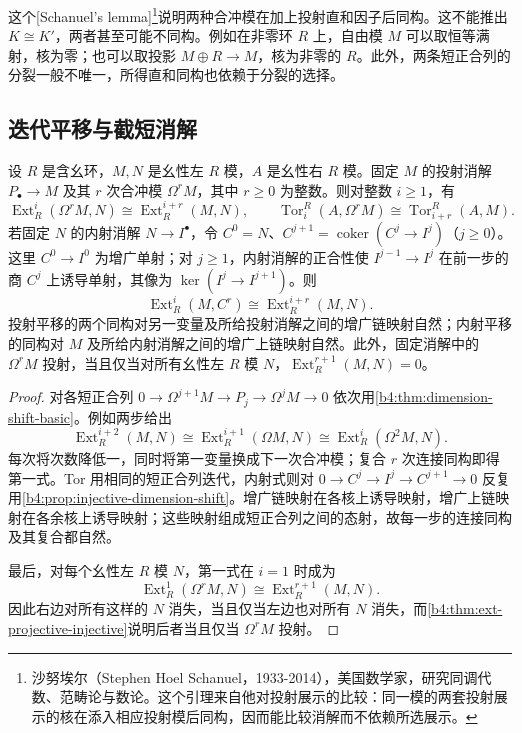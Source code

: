 这个[Schanuel's lemma]\footnote{沙努埃尔（Stephen Hoel Schanuel，1933-2014），美国数学家，研究同调代数、范畴论与数论。这个引理来自他对投射展示的比较：同一模的两套投射展示的核在添入相应投射模后同构，因而能比较消解而不依赖所选展示。}说明两种合冲模在加上投射直和因子后同构。这不能推出 \(K\cong K'\)，两者甚至可能不同构。例如在非零环 \(R\) 上，自由模 \(M\) 可以取恒等满射，核为零；也可以取投影 \(M\oplus R\to M\)，核为非零的 \(R\)。此外，两条短正合列的分裂一般不唯一，所得直和同构也依赖于分裂的选择。

\subsection{迭代平移与截短消解}
\label{b4:subsec:0805:03}

\begin{proposition}\label{b4:prop:iterated-dimension-shift}
	设 \(R\) 是含幺环，\(M,N\) 是幺性左 \(R\) 模，\(A\) 是幺性右 \(R\) 模。固定 \(M\) 的投射消解 \(P_\bullet\to M\) 及其 \(r\) 次合冲模 \(\Omega^rM\)，其中 \(r\ge0\) 为整数。则对整数 \(i\ge1\)，有
	\[
		\operatorname{Ext}_R^i(\Omega^rM,N)\cong\operatorname{Ext}_R^{i+r}(M,N), \qquad \operatorname{Tor}_i^R(A,\Omega^rM)\cong\operatorname{Tor}_{i+r}^R(A,M).
	\]
	若固定 \(N\) 的内射消解 \(N\to I^\bullet\)，令 \(C^0=N\)、\(C^{j+1}=\operatorname{coker}(C^j\to I^j)\)（\(j\ge0\)）。这里 \(C^0\to I^0\) 为增广单射；对 \(j\ge1\)，内射消解的正合性使 \(I^{j-1}\to I^j\) 在前一步的商 \(C^j\) 上诱导单射，其像为 \(\ker(I^j\to I^{j+1})\)。则
	\[
		\operatorname{Ext}_R^i(M,C^r)\cong\operatorname{Ext}_R^{i+r}(M,N).
	\]
	投射平移的两个同构对另一变量及所给投射消解之间的增广链映射自然；内射平移的同构对 \(M\) 及所给内射消解之间的增广上链映射自然。此外，固定消解中的 \(\Omega^rM\) 投射，当且仅当对所有幺性左 \(R\) 模 \(N\)，\(\operatorname{Ext}_R^{r+1}(M,N)=0\)。
\end{proposition}
\begin{proof}
	对各短正合列 \(0\to\Omega^{j+1}M\to P_j\to\Omega^jM\to0\) 依次用\cref{b4:thm:dimension-shift-basic}。例如两步给出
	\[
		\operatorname{Ext}_R^{i+2}(M,N)\cong\operatorname{Ext}_R^{i+1}(\Omega M,N) \cong\operatorname{Ext}_R^i(\Omega^2M,N).
	\]
	每次将次数降低一，同时将第一变量换成下一次合冲模；复合 \(r\) 次连接同构即得第一式。Tor 用相同的短正合列迭代，内射式则对 \(0\to C^j\to I^j\to C^{j+1}\to0\) 反复用\cref{b4:prop:injective-dimension-shift}。增广链映射在各核上诱导映射，增广上链映射在各余核上诱导映射；这些映射组成短正合列之间的态射，故每一步的连接同构及其复合都自然。

	最后，对每个幺性左 \(R\) 模 \(N\)，第一式在 \(i=1\) 时成为
	\[
		\operatorname{Ext}_R^1(\Omega^rM,N)\cong\operatorname{Ext}_R^{r+1}(M,N).
	\]
	因此右边对所有这样的 \(N\) 消失，当且仅当左边也对所有 \(N\) 消失，而\cref{b4:thm:ext-projective-injective}说明后者当且仅当 \(\Omega^rM\) 投射。
\end{proof}

